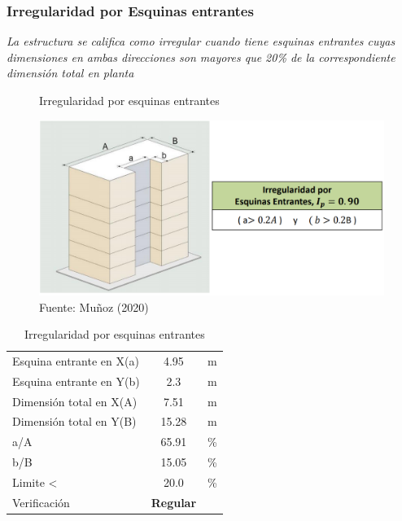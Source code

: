 \documentclass{article}%
\begin{document}
%
\subsubsection{Irregularidad por Esquinas entrantes}%
\label{ssubsec:IrregularidadporEsquinasentrantes}%
\begin{tcolorbox}[colback=gray!5!white,colframe=cyan!75!black,fonttitle=\bfseries,title=Tabla N°9 E-030]%
\textit{La estructura se califica como irregular cuando tiene esquinas entrantes  cuyas  dimensiones  en  ambas  direcciones  son mayores que 20\% de la correspondiente dimensión total en planta}%
\end{tcolorbox}%


\begin{figure}[H]%
\centering%
\caption{Irregularidad por esquinas entrantes}%
\includegraphics[scale=0.5]{images/i_esquinas.PNG}%
\caption*{\small Fuente: Muñoz (2020)}%
\end{figure}

%


\begin{table}[H]%
\centering%
\caption{Irregularidad por esquinas entrantes}%
\begin{tabular}{llcr}%
\cline{1-3}%
\multicolumn{2}{l}{Esquina entrante en X(a)} & 4.95 & \multicolumn{1}{l}{m} \\%
\multicolumn{2}{l}{Esquina entrante en Y(b)} & 2.3 & \multicolumn{1}{l}{m} \\%
\multicolumn{2}{l}{Dimensión total en X(A)} & 7.51 & \multicolumn{1}{l}{m} \\%
\multicolumn{2}{l}{Dimensión total en Y(B)} & 15.28 & \multicolumn{1}{l}{m} \\%
\multicolumn{2}{l}{a/A} & 65.91 & \multicolumn{1}{l}{\%} \\%
\multicolumn{2}{l}{b/B} & 15.05 & \multicolumn{1}{l}{\%} \\%
\multicolumn{2}{l}{Limite <} & 20.0 & \multicolumn{1}{l}{\%} \\%
\multicolumn{2}{l}{Verificación} & \textcolor[rgb]{ .267,  .447,  .769}{\textbf{Regular}} & \multicolumn{1}{l}{} \\%
\cline{1-3}%
\end{tabular}%
\end{table}
\end{document}
